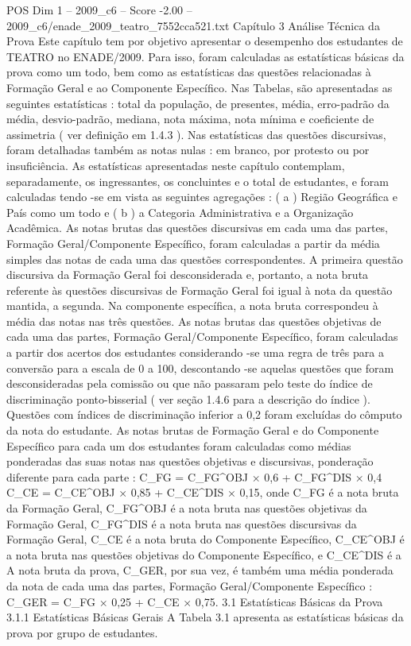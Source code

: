 \begin{textsample}{POS Dim 1 – 2009\_c6 – Score -2.00 – 2009\_c6/enade\_2009\_teatro\_7552cca521.txt}  \label{ex:f1_pos_228}
Capítulo 3 Análise Técnica da Prova Este capítulo tem por objetivo apresentar o desempenho dos estudantes de TEATRO no ENADE/2009.
Para isso, foram calculadas as estatísticas básicas da prova como um todo, bem como as estatísticas das questões relacionadas à Formação Geral e ao Componente Específico.
Nas Tabelas, são apresentadas as seguintes estatísticas : total da população, de presentes, média, erro-padrão da média, desvio-padrão, mediana, nota máxima, nota mínima e coeficiente de assimetria ( ver definição em 1.4.3 ).
Nas estatísticas das questões discursivas, foram detalhadas também as notas nulas : em branco, por protesto ou por insuficiência.
As estatísticas apresentadas neste capítulo contemplam, separadamente, os ingressantes, os concluintes e o total de estudantes, e foram calculadas tendo -se em vista as seguintes agregações : ( a ) Região Geográfica e País como um todo e ( b ) a Categoria Administrativa e a Organização Acadêmica.
As notas brutas das questões discursivas em cada uma das partes, Formação Geral/Componente Específico, foram calculadas a partir da média simples das notas de cada uma das questões correspondentes.
A primeira questão discursiva da Formação Geral foi desconsiderada e, portanto, a nota bruta referente às questões discursivas de Formação Geral foi igual à nota da questão mantida, a segunda.
Na componente específica, a nota bruta correspondeu à média das notas nas três questões.
As notas brutas das questões objetivas de cada uma das partes, Formação Geral/Componente Específico, foram calculadas a partir dos acertos dos estudantes considerando -se uma regra de três para a conversão para a escala de 0 a 100, descontando -se aquelas questões que foram desconsideradas pela comissão ou que não passaram pelo teste do índice de discriminação ponto-bisserial ( ver seção 1.4.6 para a descrição do índice ).
Questões com índices de discriminação inferior a 0,2 foram excluídas do cômputo da nota do estudante.
As notas brutas de Formação Geral e do Componente Específico para cada um dos estudantes foram calculadas como médias ponderadas das suas notas nas questões objetivas e discursivas, ponderação diferente para cada parte : C\_FG = C\_FG\textasciicircum{}OBJ × 0,6 + C\_FG\textasciicircum{}DIS × 0,4 C\_CE = C\_CE\textasciicircum{}OBJ × 0,85 + C\_CE\textasciicircum{}DIS × 0,15, onde C\_FG é a nota bruta da Formação Geral, C\_FG\textasciicircum{}OBJ é a nota bruta nas questões objetivas da Formação Geral, C\_FG\textasciicircum{}DIS é a nota bruta nas questões discursivas da Formação Geral, C\_CE é a nota bruta do Componente Específico, C\_CE\textasciicircum{}OBJ é a nota bruta nas questões objetivas do Componente Específico, e C\_CE\textasciicircum{}DIS é a A nota bruta da prova, C\_GER, por sua vez, é também uma média ponderada da nota de cada uma das partes, Formação Geral/Componente Específico : C\_GER = C\_FG × 0,25 + C\_CE × 0,75. 3.1 Estatísticas Básicas da Prova 3.1.1 Estatísticas Básicas Gerais A Tabela 3.1 apresenta as estatísticas básicas da prova por grupo de estudantes.

\end{textsample}

